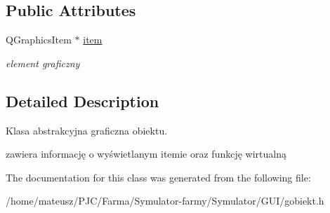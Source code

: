 \subsection*{Public Attributes}
\begin{DoxyCompactItemize}
\item 
\mbox{\label{class_g_obiekt_a805b718a614cb01f0facb76deedc3edb}} 
Q\+Graphics\+Item $\ast$ \mbox{\hyperlink{class_g_obiekt_a805b718a614cb01f0facb76deedc3edb}{item}}
\begin{DoxyCompactList}\small\item\em element graficzny \end{DoxyCompactList}\end{DoxyCompactItemize}


\subsection{Detailed Description}
Klasa abstrakcyjna graficzna obiektu. 

zawiera informację o wyświetlanym itemie oraz funkcję wirtualną 

The documentation for this class was generated from the following file\+:\begin{DoxyCompactItemize}
\item 
/home/mateusz/\+P\+J\+C/\+Farma/\+Symulator-\/farmy/\+Symulator/\+G\+U\+I/gobiekt.\+h\end{DoxyCompactItemize}
